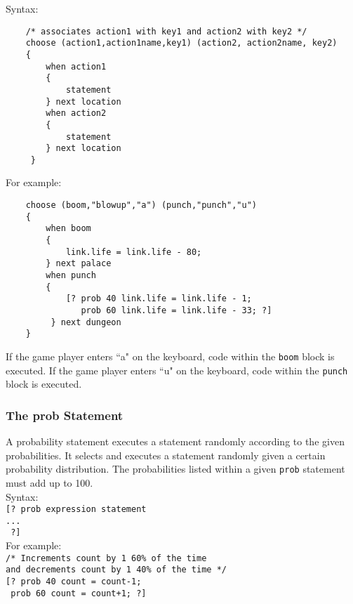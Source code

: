 \documentclass[12pt]{article}
\begin{document}
\noindent Syntax:

\begin{verbatim}
    /* associates action1 with key1 and action2 with key2 */
    choose (action1,action1name,key1) (action2, action2name, key2) 
    {
        when action1 
        {
            statement
        } next location
        when action2 
        {
            statement
        } next location
     }
\end{verbatim}

\noindent For example: 
\begin{verbatim}
    choose (boom,"blowup","a") (punch,"punch","u") 
    {
        when boom 
        {
            link.life = link.life - 80;
        } next palace
        when punch 
        {
            [? prob 40 link.life = link.life - 1;
               prob 60 link.life = link.life - 33; ?]
         } next dungeon
    }
\end{verbatim}
If the game player enters ``a" on the keyboard, code within the \texttt{boom} block is executed.  If the game player enters ``u" on the keyboard, code within the \texttt{punch} block is executed.

\subsubsection{The prob Statement}
A probability statement executes a statement randomly according to the given probabilities.  It selects and executes a statement randomly given a certain probability distribution.  The probabilities listed within a given \texttt{prob} statement must add up to 100. \\

\noindent Syntax: \\

\texttt{[? prob expression statement \\
\indent \indent \indent \texttt{... } \\
\indent \texttt{ ?]}} \\

\noindent For example: \\

\texttt{/* Increments count by 1 60\% of the time} \\
\indent \indent \texttt{and decrements count by 1 40\% of the time */} \\
\indent \texttt{[? prob 40 count = count-1;} \\
\indent \indent \texttt{   prob 60 count = count+1; ?]}
\end{document}
